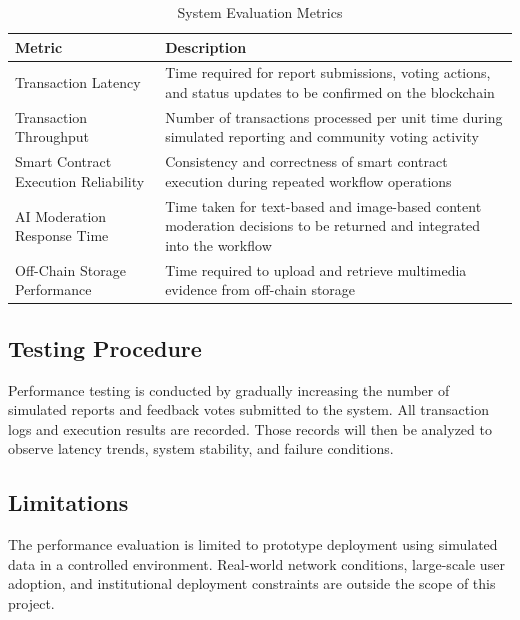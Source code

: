 \begin{table}[h!]
\centering
\small
\renewcommand{\arraystretch}{1.4}
\caption{System Evaluation Metrics}
\label{tab:evaluation-metrics}
\begin{tabular}{|p{4cm}|p{10cm}|}
\hline
\textbf{Metric} & \textbf{Description} \\ \hline

Transaction Latency &
Time required for report submissions, voting actions, and status updates to be
confirmed on the blockchain \\ \hline

Transaction Throughput &
Number of transactions processed per unit time during simulated reporting and
community voting activity  \\ \hline

Smart Contract Execution Reliability &
Consistency and correctness of smart contract execution during repeated workflow
operations \\ \hline

AI Moderation Response Time &
Time taken for text-based and image-based content moderation decisions to be
returned and integrated into the workflow  \\ \hline

Off-Chain Storage Performance &
Time required to upload and retrieve multimedia evidence from off-chain storage  \\ \hline

\end{tabular}
\end{table}


\subsection{Testing Procedure}

Performance testing is conducted by gradually increasing the number of simulated reports and feedback votes submitted to the system. All transaction logs and execution results are recorded. Those records will then be analyzed to observe latency trends, system stability, and failure conditions.

\subsection{Limitations}

The performance evaluation is limited to prototype deployment using simulated
data in a controlled environment. Real-world network conditions, large-scale user
adoption, and institutional deployment constraints are outside the scope of this
project. 
